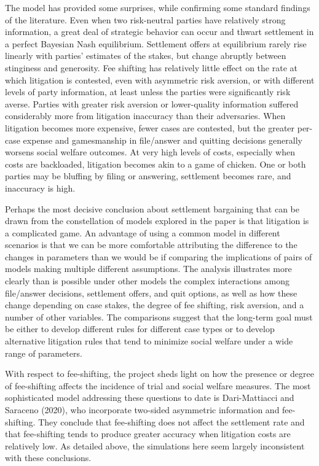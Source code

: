 \documentclass{article}
\begin{document}
The model has provided some surprises, while confirming some standard findings of the literature. Even when two risk-neutral parties have relatively strong information, a great deal of strategic behavior can occur and thwart settlement in a perfect Bayesian Nash equilibrium. Settlement offers at equilibrium rarely rise linearly with parties' estimates of the stakes, but change abruptly between stinginess and generosity. Fee shifting has relatively little effect on the rate at which litigation is contested, even with asymmetric risk aversion, or with different levels of party information, at least unless the parties were significantly risk averse. Parties with greater risk aversion or lower-quality information suffered considerably more from litigation inaccuracy than their adversaries.  When litigation becomes more expensive, fewer cases are contested, but the greater per-case expense and gamesmanship in file/answer and quitting decisions generally worsens social welfare outcomes. At very high levels of costs, especially when costs are backloaded, litigation becomes akin to a game of chicken. One or both parties may be bluffing by filing or answering, settlement becomes rare, and inaccuracy is high. 

Perhaps the most decisive conclusion about settlement bargaining that can be drawn from the constellation of models explored in the paper is that litigation is a complicated game. An advantage of using a common model in different scenarios is that we can be more comfortable attributing the difference to the changes in parameters than we would be if comparing the implications of pairs of models making multiple different assumptions. The analysis illustrates more clearly than is possible under other models the complex interactions among file/answer decisions, settlement offers, and quit options, as well as how these change depending on case stakes, the degree of fee shifting, risk aversion, and a number of other variables. The comparisons suggest that the long-term goal must be either to develop different rules for different case types or to develop alternative litigation rules that tend to minimize social welfare under a wide range of parameters. 

With respect to fee-shifting, the project sheds light on how the presence or degree of fee-shifting affects the incidence of trial and social welfare measures. The most sophisticated model addressing these questions to date is Dari-Mattiacci and Saraceno (2020), who incorporate two-sided asymmetric information and fee-shifting. They conclude that fee-shifting does not affect the settlement rate and that fee-shifting tends to produce greater accuracy when litigation costs are relatively low. As detailed above, the simulations here seem largely inconsistent with these conclusions. 
\end{document}

